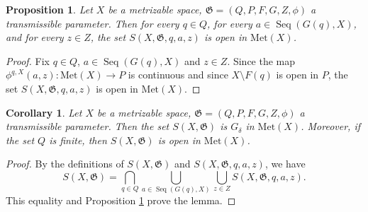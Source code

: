 \documentclass[a4paper, 12pt]{amsart}
\theoremstyle{plain}
\newtheorem{prop}[thm]{Proposition}
\newtheorem{cor}[thm]{Corollary}
\theoremstyle{definition}
\theoremstyle{remark}
\DeclareMathOperator{\seq}{Seq}
\newcommand{\met}[1]{\mathrm{Met}(#1)}
\begin{document}
\begin{prop}\label{prop:open}
Let $X$ be a metrizable space, 
$\mathfrak{G}=(Q, P, F, G, Z, \phi)$ 
 a transmissible  parameter. 
Then 
for every 
$q\in Q$, 
for every 
$a\in \seq(G(q), X)$, 
and 
for every 
$z\in Z$, 
the set 
$S(X, \mathfrak{G}, q, a, z)$
is open in 
$\met{X}$. 
\end{prop}
\begin{proof}
Fix $q\in Q$, 
$a\in \seq(G(q), X)$ 
and 
$z\in Z$. 
Since the map 
$\phi^{q, X}(a, z)\colon \met{X}\to P$ 
is continuous
and since 
$X\setminus F(q)$
 is open in 
$P$, 
 the set 
 $S(X, \mathfrak{G}, q, a, z)$ 
 is open in 
 $\met{X}$. 
\end{proof}
\begin{cor}\label{cor:open}
Let $X$ be a metrizable space, 
$\mathfrak{G}=(Q, P, F, G, Z, \phi)$ 
 a transmissible  parameter. 
Then 
the set 
$S(X, \mathfrak{G})$ 
is 
$G_{\delta}$ 
in 
$\met{X}$.
Moreover, 
if the set 
$Q$ 
is finite, 
then 
$S(X, \mathfrak{G})$ 
is open in 
$\met{X}$. 
\end{cor}
\begin{proof}
By the definitions of 
$S(X, \mathfrak{G})$ 
and 
$S(X, \mathfrak{G}, q, a, z)$, 
we have 
\[
S(X, \mathfrak{G})
=
\bigcap_{q\in Q}
\bigcup_{a\in \seq(G(q), X)}
\bigcup_{z\in Z}
S(X, \mathfrak{G}, q, a, z). 
\]
This equality and  Proposition
 \ref{prop:open} prove
the lemma. 
\end{proof}
\end{document}
